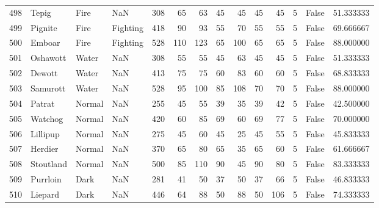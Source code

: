 \begin{tabular}{rlllrrrrrrrrlr}
 498 &                      Tepig &      Fire &       NaN &    308 &   65 &      63 &       45 &       45 &       45 &     45 &           5 &      False &   51.333333 \\
 499 &                    Pignite &      Fire &  Fighting &    418 &   90 &      93 &       55 &       70 &       55 &     55 &           5 &      False &   69.666667 \\
 500 &                     Emboar &      Fire &  Fighting &    528 &  110 &     123 &       65 &      100 &       65 &     65 &           5 &      False &   88.000000 \\
 501 &                   Oshawott &     Water &       NaN &    308 &   55 &      55 &       45 &       63 &       45 &     45 &           5 &      False &   51.333333 \\
 502 &                     Dewott &     Water &       NaN &    413 &   75 &      75 &       60 &       83 &       60 &     60 &           5 &      False &   68.833333 \\
 503 &                   Samurott &     Water &       NaN &    528 &   95 &     100 &       85 &      108 &       70 &     70 &           5 &      False &   88.000000 \\
 504 &                     Patrat &    Normal &       NaN &    255 &   45 &      55 &       39 &       35 &       39 &     42 &           5 &      False &   42.500000 \\
 505 &                    Watchog &    Normal &       NaN &    420 &   60 &      85 &       69 &       60 &       69 &     77 &           5 &      False &   70.000000 \\
 506 &                   Lillipup &    Normal &       NaN &    275 &   45 &      60 &       45 &       25 &       45 &     55 &           5 &      False &   45.833333 \\
 507 &                    Herdier &    Normal &       NaN &    370 &   65 &      80 &       65 &       35 &       65 &     60 &           5 &      False &   61.666667 \\
 508 &                  Stoutland &    Normal &       NaN &    500 &   85 &     110 &       90 &       45 &       90 &     80 &           5 &      False &   83.333333 \\
 509 &                   Purrloin &      Dark &       NaN &    281 &   41 &      50 &       37 &       50 &       37 &     66 &           5 &      False &   46.833333 \\
 510 &                    Liepard &      Dark &       NaN &    446 &   64 &      88 &       50 &       88 &       50 &    106 &           5 &      False &   74.333333 \\

\end{tabular}
